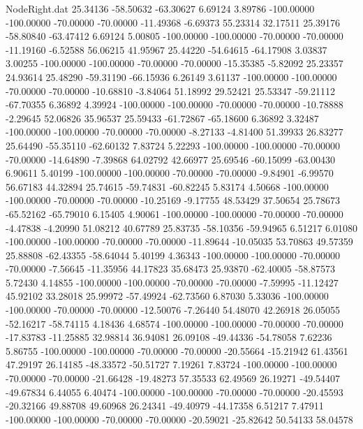 \begin{filecontents}{NodeRight.dat}
  25.34136  -58.50632  -63.30627     6.69124    3.89786 -100.00000 -100.00000  -70.00000  -70.00000  -11.49368   -6.69373   55.23314   32.17511
  25.39176  -58.80840  -63.47412     6.69124    5.00805 -100.00000 -100.00000  -70.00000  -70.00000  -11.19160   -6.52588   56.06215   41.95967
  25.44220  -54.64615  -64.17908     3.03837    3.00255 -100.00000 -100.00000  -70.00000  -70.00000  -15.35385   -5.82092   25.23357   24.93614
  25.48290  -59.31190  -66.15936     6.26149    3.61137 -100.00000 -100.00000  -70.00000  -70.00000  -10.68810   -3.84064   51.18992   29.52421
  25.53347  -59.21112  -67.70355     6.36892    4.39924 -100.00000 -100.00000  -70.00000  -70.00000  -10.78888   -2.29645   52.06826   35.96537
  25.59433  -61.72867  -65.18600     6.36892    3.32487 -100.00000 -100.00000  -70.00000  -70.00000   -8.27133   -4.81400   51.39933   26.83277
  25.64490  -55.35110  -62.60132     7.83724    5.22293 -100.00000 -100.00000  -70.00000  -70.00000  -14.64890   -7.39868   64.02792   42.66977
  25.69546  -60.15099  -63.00430     6.90611    5.40199 -100.00000 -100.00000  -70.00000  -70.00000   -9.84901   -6.99570   56.67183   44.32894
  25.74615  -59.74831  -60.82245     5.83174    4.50668 -100.00000 -100.00000  -70.00000  -70.00000  -10.25169   -9.17755   48.53429   37.50654
  25.78673  -65.52162  -65.79010     6.15405    4.90061 -100.00000 -100.00000  -70.00000  -70.00000   -4.47838   -4.20990   51.08212   40.67789
  25.83735  -58.10356  -59.94965     6.51217    6.01080 -100.00000 -100.00000  -70.00000  -70.00000  -11.89644  -10.05035   53.70863   49.57359
  25.88808  -62.43355  -58.64044     5.40199    4.36343 -100.00000 -100.00000  -70.00000  -70.00000   -7.56645  -11.35956   44.17823   35.68473
  25.93870  -62.40005  -58.87573     5.72430    4.14855 -100.00000 -100.00000  -70.00000  -70.00000   -7.59995  -11.12427   45.92102   33.28018
  25.99972  -57.49924  -62.73560     6.87030    5.33036 -100.00000 -100.00000  -70.00000  -70.00000  -12.50076   -7.26440   54.48070   42.26918
  26.05055  -52.16217  -58.74115     4.18436    4.68574 -100.00000 -100.00000  -70.00000  -70.00000  -17.83783  -11.25885   32.98814   36.94081
  26.09108  -49.44336  -54.78058     7.62236    5.86755 -100.00000 -100.00000  -70.00000  -70.00000  -20.55664  -15.21942   61.43561   47.29197
  26.14185  -48.33572  -50.51727     7.19261    7.83724 -100.00000 -100.00000  -70.00000  -70.00000  -21.66428  -19.48273   57.35533   62.49569
  26.19271  -49.54407  -49.67834     6.44055    6.40474 -100.00000 -100.00000  -70.00000  -70.00000  -20.45593  -20.32166   49.88708   49.60968
  26.24341  -49.40979  -44.17358     6.51217    7.47911 -100.00000 -100.00000  -70.00000  -70.00000  -20.59021  -25.82642   50.54133   58.04578

\end{filecontents}
